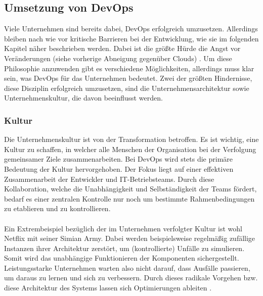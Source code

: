 \subsection{Umsetzung von DevOps}
Viele Unternehmen sind bereits dabei, DevOps erfolgreich umzusetzen. Allerdings bleiben nach wie vor kritische Barrieren bei der Entwicklung, wie sie im folgenden Kapitel näher beschrieben werden. Dabei ist die größte Hürde die Angst vor Veränderungen (siehe vorherige Abneigung gegenüber Clouds) \cite{continuousdelivery.2017}. Um diese Philosophie anzuwenden gibt es verschiedene Möglichkeiten, allerdings muss klar sein, was DevOps für das Unternehmen bedeutet. Zwei der größten Hindernisse, diese Disziplin erfolgreich umzusetzen, sind die Unternehmensarchitektur sowie Unternehmenskultur, die davon beeinflusst werden.

\subsubsection{Kultur}
Die Unternehmenskultur ist von der Transformation betroffen. Es ist wichtig, eine Kultur zu schaffen, in welcher alle Menschen der Organisation bei der Verfolgung gemeinsamer Ziele zusammenarbeiten. Bei DevOps wird stets die primäre Bedeutung der Kultur hervorgehoben. Der Fokus liegt auf einer effektiven Zusammenarbeit der Entwickler und IT-Betriebsteams. Durch diese Kollaboration, welche die Unabhängigkeit und Selbständigkeit der Teams fördert, bedarf es einer zentralen Kontrolle nur noch um bestimmte Rahmenbedingungen zu etablieren und zu kontrollieren.\\ \\    
Ein Extrembeispiel bezüglich der im Unternehmen verfolgter Kultur ist wohl Netflix mit seiner Simian Army. Dabei werden beispielsweise regelmäßig zufällige Instanzen ihrer Architektur zerstört, um (kontrollierte) Unfälle zu simulieren. Somit wird das unabhängige Funktionieren der Komponenten sichergestellt. Leistungsstarke Unternehmen warten also nicht darauf, dass Ausfälle passieren, um daraus zu lernen und sich zu verbessern. Durch dieses radikale Vorgehen bzw. diese Architektur des Systems lassen sich Optimierungen ableiten \cite{continuousdelivery.2017}.


